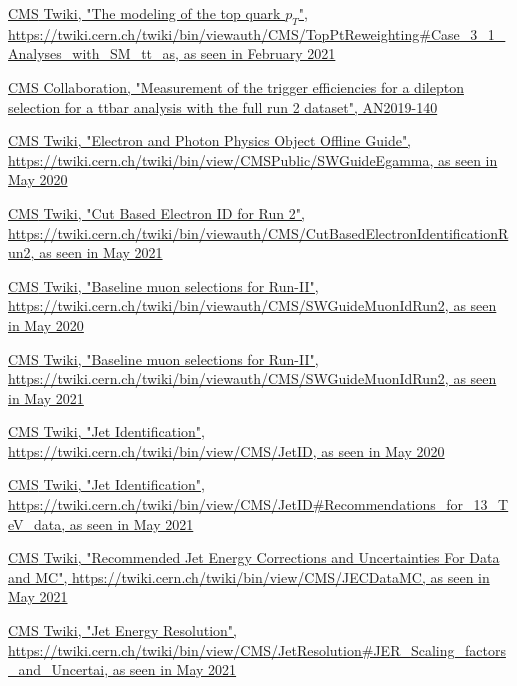 \documentclass[a4paper, 10pt, openright]{report}
\begin{document}
\begin{thebibliography}{1}
\href{https://twiki.cern.ch/twiki/bin/viewauth/CMS/TopPtReweighting\#Case\_3\_1\_Analyses\_with\_SM\_tt\_as}{\ac{CMS} Twiki,
"The modeling of the top quark $p_T$", \url{https://twiki.cern.ch/twiki/bin/viewauth/CMS/TopPtReweighting\#Case\_3\_1\_Analyses\_with\_SM\_tt\_as}, as seen in February 2021}

\href{http://cms.cern.ch/iCMS/user/noteinfo?cmsnoteid=CMS\%20AN-2019/140}{CMS Collaboration,
"Measurement of the trigger efficiencies for a dilepton selection for a ttbar analysis with the full run 2 dataset", AN2019-140}

\href{https://twiki.cern.ch/twiki/bin/view/CMSPublic/SWGuideEgamma}{\ac{CMS} Twiki,
"Electron and Photon Physics Object Offline Guide", \url{https://twiki.cern.ch/twiki/bin/view/CMSPublic/SWGuideEgamma}, as seen in May 2020}

\href{https://twiki.cern.ch/twiki/bin/viewauth/CMS/CutBasedElectronIdentificationRun2}{\ac{CMS} Twiki,
"Cut Based Electron ID for Run 2", \url{https://twiki.cern.ch/twiki/bin/viewauth/CMS/CutBasedElectronIdentificationRun2}, as seen in May 2021}

\href{https://twiki.cern.ch/twiki/bin/viewauth/CMS/SWGuideMuonIdRun2}{\ac{CMS} Twiki,
"Baseline muon selections for Run-II", \url{https://twiki.cern.ch/twiki/bin/viewauth/CMS/SWGuideMuonIdRun2}, as seen in May 2020}

\href{https://twiki.cern.ch/twiki/bin/viewauth/CMS/SWGuideMuonIdRun2}{\ac{CMS} Twiki,
"Baseline muon selections for Run-II", \url{https://twiki.cern.ch/twiki/bin/viewauth/CMS/SWGuideMuonIdRun2}, as seen in May 2021}

\href{https://twiki.cern.ch/twiki/bin/view/CMS/JetID}{\ac{CMS} Twiki,
"Jet Identification", \url{https://twiki.cern.ch/twiki/bin/view/CMS/JetID}, as seen in May 2020}

\href{https://twiki.cern.ch/twiki/bin/view/CMS/JetID\#Recommendations\_for\_13\_TeV\_data}{\ac{CMS} Twiki,
"Jet Identification", \url{https://twiki.cern.ch/twiki/bin/view/CMS/JetID\#Recommendations\_for\_13\_TeV\_data}, as seen in May 2021}

\href{https://twiki.cern.ch/twiki/bin/view/CMS/JECDataMC}{\ac{CMS} Twiki,
"Recommended Jet Energy Corrections and Uncertainties For Data and MC", \url{https://twiki.cern.ch/twiki/bin/view/CMS/JECDataMC}, as seen in May 2021}

\href{https://twiki.cern.ch/twiki/bin/view/CMS/JetResolution\#JER_Scaling_factors_and_Uncertai}{\ac{CMS} Twiki,
"Jet Energy Resolution", \url{https://twiki.cern.ch/twiki/bin/view/CMS/JetResolution\#JER_Scaling_factors_and_Uncertai}, as seen in May 2021}


\end{thebibliography}
\end{document}
